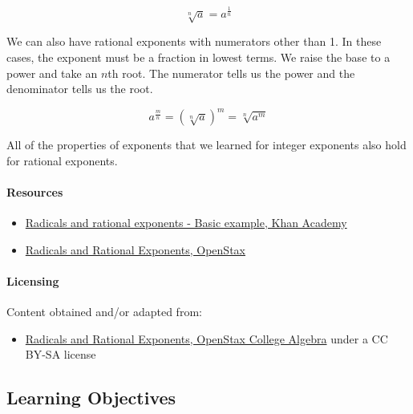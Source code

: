 $$\sqrt[n]{a} = a^{\frac{1}{n}}$$

We can also have rational exponents with numerators other than 1. In these cases, the exponent must be a fraction in lowest terms. We raise the base to a power and take an $n$th root. The numerator tells us the power and the denominator tells us the root.

$$a^{\frac{m}{n}} = \left(\sqrt[n]{a}\right)^m = \sqrt[n]{a^m}$$

All of the properties of exponents that we learned for integer exponents also hold for rational exponents.

\paragraph{Resources}

\begin{itemize}
    \item \href{https://www.khanacademy.org/test-prep/sat/sat-math-practice/new-sat-passport-advanced-mathematics/v/sat-math-p3-easier}{Radicals and rational exponents - Basic example, Khan Academy}
    \item \href{https://openstax.org/books/college-algebra/pages/1-3-radicals-and-rational-exponents}{Radicals and Rational Exponents, OpenStax}
\end{itemize}

\paragraph{Licensing}

Content obtained and/or adapted from:

\begin{itemize}
    \item \href{https://openstax.org/books/college-algebra/pages/1-3-radicals-and-rational-exponents}{Radicals and Rational Exponents, OpenStax College Algebra} under a CC BY-SA license
\end{itemize}

\subsection{Learning Objectives}

